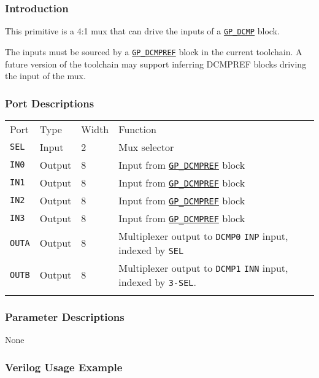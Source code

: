 \documentclass[11pt]{article}
\newcommand{\tokenstyle}[1]{\texttt{#1}}
\newcommand{\whenstyle}[1]{{\fontseries{sb}\selectfont#1}}
\newcommand{\tokenref}[2]{\hyperref[#2]{\tokenstyle{#1}}}
\newcommand{\thinhline}{\Xhline{1\arrayrulewidth}}
\newcommand{\thickhline}{\Xhline{2.5\arrayrulewidth}}
\begin{document}
\subsubsection{Introduction}

This primitive is a 4:1 mux that can drive the inputs of a \tokenref{GP\_DCMP}{gp-dcmp} block.

The inputs must be sourced by a \tokenref{GP\_DCMPREF}{gp-dcmpref} block in the current toolchain. A future version of the
toolchain may support inferring DCMPREF blocks driving the input of the mux.

\subsubsection{Port Descriptions}

\begin{tabularx}{\textwidth}{lllX}
\thinhline
\whenstyle{Port} & \whenstyle{Type} & \whenstyle{Width} & \whenstyle{Function} \\
\thickhline
\tokenstyle{SEL} & Input & 2 & Mux selector \\
\thinhline
\tokenstyle{IN0} & Output & 8 & Input from \tokenref{GP\_DCMPREF}{gp-dcmpref} block\\
\thinhline
\tokenstyle{IN1} & Output & 8 & Input from \tokenref{GP\_DCMPREF}{gp-dcmpref} block\\
\thinhline
\tokenstyle{IN2} & Output & 8 & Input from \tokenref{GP\_DCMPREF}{gp-dcmpref} block\\
\thinhline
\tokenstyle{IN3} & Output & 8 & Input from \tokenref{GP\_DCMPREF}{gp-dcmpref} block\\
\thinhline
\tokenstyle{OUTA} & Output & 8 & Multiplexer output to \tokenstyle{DCMP0} \tokenstyle{INP} input, indexed by \tokenstyle{SEL} \\
\thinhline
\tokenstyle{OUTB} & Output & 8 & Multiplexer output to \tokenstyle{DCMP1} \tokenstyle{INN} input, indexed by \tokenstyle{3-SEL}. \\
\thinhline
\end{tabularx}

\subsubsection{Parameter Descriptions}

None

\subsubsection{Verilog Usage Example}
\end{document}
